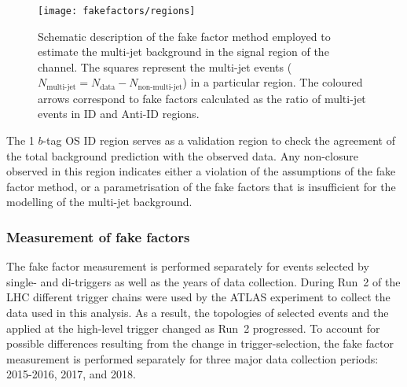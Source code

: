 \begin{figure}[htbp]
  \centering

  \texttt{[image: fakefactors/regions]}

  \caption{Schematic description of the fake factor method employed to
    estimate the multi-jet background in the signal region of the
    \hadhad channel. The squares represent the multi-jet events
    ($N_\text{multi-jet} = N_\text{data} - N_\text{non-multi-jet}$) in
    a particular region. The coloured arrows correspond to fake
    factors calculated as the ratio of multi-jet events in ID and
    Anti-ID regions.}
  \label{fig:fakefactor_regions}
\end{figure}

The 1 $b$-tag OS ID region serves as a validation region to check the
agreement of the total background prediction with the observed
data. Any non-closure observed in this region indicates either a
violation of the assumptions of the fake factor method, or a
parametrisation of the fake factors that is insufficient for the
modelling of the multi-jet background.



\subsubsection{Measurement of fake factors}

The fake factor measurement is performed separately for events
selected by single- and di-\tauhadvis triggers as well as the years of
data collection. During Run~2 of the LHC different \tauhadvis trigger
chains were used by the ATLAS experiment to collect the data used in
this analysis. As a result, the topologies of selected events and the
\tauid applied at the high-level trigger changed as Run~2
progressed. To account for possible differences resulting from the
change in trigger-selection, the fake factor measurement is performed
separately for three major data collection periods: 2015-2016, 2017,
and 2018.

